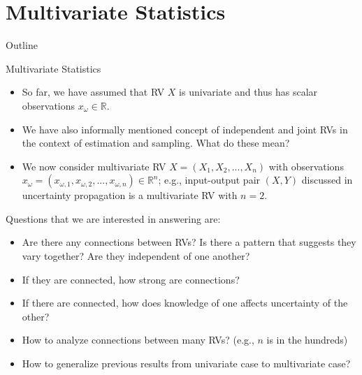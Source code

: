 \documentclass[handout,9pt]{beamer}
\begin{document}
\section{Multivariate Statistics}
\begin{frame}{Outline}
\tableofcontents[currentsection]
\end{frame}

%
\begin{frame}{Multivariate Statistics}

\begin{itemize}
\setlength{\itemsep}{10pt}
\item So far, we have assumed that RV $X$ is univariate and thus has scalar observations $x_\omega \in \mathbb{R}$.  

\item We have also informally mentioned concept of independent and joint RVs in the context of estimation and sampling.  What do these mean?

\item We now consider multivariate RV $X=(X_1,X_2,...,X_n)$ with observations $x_\omega=(x_{\omega,1},x_{\omega,2},...,x_{\omega,n})\in \mathbb{R}^n$; e.g., input-output pair $(X,Y)$ discussed in uncertainty propagation is a multivariate RV with $n=2$.
 
\end{itemize}

Questions that we are interested in answering are:
\begin{block}{}
\begin{itemize}
\setlength{\itemsep}{5pt}
\item Are there any connections between RVs? Is there a pattern that suggests they vary together? Are they independent of one another?
\item If they are connected, how strong are connections?
\item If there are connected, how does knowledge of one affects uncertainty of the other? 
\item How to analyze connections between many RVs? (e.g., $n$ is in the hundreds)
\item How to generalize previous results from univariate case to multivariate case? 
\end{itemize}
\end{block}

\end{frame}
\end{document}

